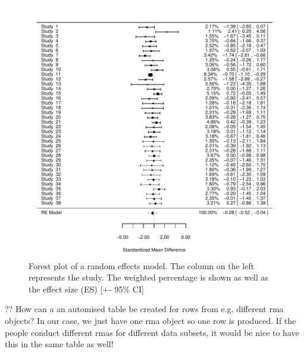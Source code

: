 \documentclass[11pt, a4paper]{article} %
\begin{document}
\begin{figure}
\captionsetup{width=0.6\textwidth}
\centering
\includegraphics{sweave_document_TB-forest_re}

\caption{Forest plot of a random effects model. The column on the left represents the study. The weighted percentage is shown as well as the effect size (ES) [+- 95\% CI]}
\end{figure}

?? How can a an automised table be created for rows from e.g. different rma objects? In our case, we just have one rma object so one row is produced. If the people conduct different rmas for different data subsets, it would be nice to have this in the same table as well!\\
\bigskip




\begin{table}[ht]
\centering
\caption{Results of the meta-analysis. Includes the the egger's test and the fails-safe number for publication bias testing.} 
{\footnotesize
{}
}
\end{table}\bigskip
\end{document}
